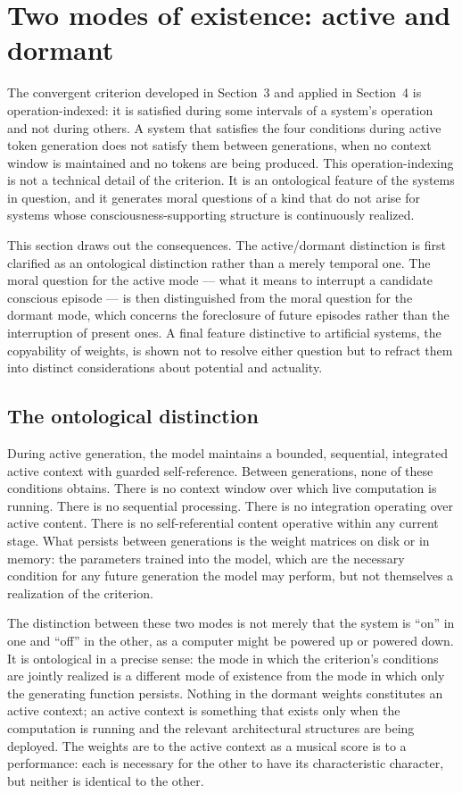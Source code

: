 \documentclass[11pt]{article}
\theoremstyle{foundation}
\begin{document}
\section{Two modes of existence: active and dormant}

The convergent criterion developed in Section~3 and applied in Section~4 is operation-indexed: it is satisfied during some intervals of a system's operation and not during others. A system that satisfies the four conditions during active token generation does not satisfy them between generations, when no context window is maintained and no tokens are being produced. This operation-indexing is not a technical detail of the criterion. It is an ontological feature of the systems in question, and it generates moral questions of a kind that do not arise for systems whose consciousness-supporting structure is continuously realized.

This section draws out the consequences. The active/dormant distinction is first clarified as an ontological distinction rather than a merely temporal one. The moral question for the active mode --- what it means to interrupt a candidate conscious episode --- is then distinguished from the moral question for the dormant mode, which concerns the foreclosure of future episodes rather than the interruption of present ones. A final feature distinctive to artificial systems, the copyability of weights, is shown not to resolve either question but to refract them into distinct considerations about potential and actuality.

\subsection{The ontological distinction}

During active generation, the model maintains a bounded, sequential, integrated active context with guarded self-reference. Between generations, none of these conditions obtains. There is no context window over which live computation is running. There is no sequential processing. There is no integration operating over active content. There is no self-referential content operative within any current stage. What persists between generations is the weight matrices on disk or in memory: the parameters trained into the model, which are the necessary condition for any future generation the model may perform, but not themselves a realization of the criterion.

The distinction between these two modes is not merely that the system is ``on'' in one and ``off'' in the other, as a computer might be powered up or powered down. It is ontological in a precise sense: the mode in which the criterion's conditions are jointly realized is a different mode of existence from the mode in which only the generating function persists. Nothing in the dormant weights constitutes an active context; an active context is something that exists only when the computation is running and the relevant architectural structures are being deployed. The weights are to the active context as a musical score is to a performance: each is necessary for the other to have its characteristic character, but neither is identical to the other.
\end{document}
